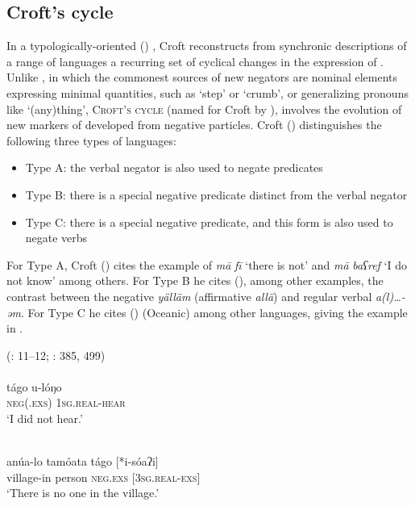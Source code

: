 \documentclass[output=paper]{langsci/langscibook}
\begin{document}
\subsection{Croft’s cycle}


In a typologically-oriented (\citeyear{Croft1991}) , Croft reconstructs from synchronic descriptions of a range of languages a recurring set of cyclical changes in the expression of . Unlike , in which the commonest sources of new negators are nominal elements expressing minimal quantities, such as ‘step’ or ‘crumb’, or generalizing pronouns like ‘(any)thing’, \textsc{Croft’s} \textsc{cycle} (named for Croft by \citealt{Kahrel1996}), involves the evolution of new markers of  developed from negative  particles. Croft (\citeyear[6]{Croft1991}) distinguishes the following three types of languages:

\begin{itemize}[noitemsep]
	\item[] Type A: the verbal negator is also used to negate  predicates
	\item[] Type B: there is a special negative  predicate distinct from the verbal negator
	\item[] Type C: there is a special negative  predicate, and this form is also used to negate verbs
\end{itemize}

For Type A, Croft (\citeyear[7]{Croft1991}) cites the example of   \textit{mā} \textit{fī} ‘there is not’ and \textit{mā} \textit{baʕref} ‘I do not know’ among others. For Type B he cites (\citeyear[9]{Croft1991}), among other examples, the contrast between the  negative  \textit{yälläm} (affirmative  \textit{allä}) and regular verbal  \textit{a(l)…-əm}. For Type C he cites (\citeyear[11--12]{Croft1991})  (Oceanic) among other languages, giving the example in .


\ea\label{man}
{ (\citealt{Croft1991}: 11–12; \citealt{Lichtenberk1983}: 385, 499)}\\
\\
\gll tágo u-lóŋo\\
     \textsc{neg(.exs)} \textsc{1sg.real-}\textsc{\textup{hear}}  \\
\glt ‘I did not hear.’

\\
\gll anúa-lo tamóata tágo [*i-sóaʔi]\\
     village-in person \textsc{neg.exs} \textsc{[3sg.real-exs]}\\
\glt  ‘There is no one in the village.’
\z
\z
\end{document}
